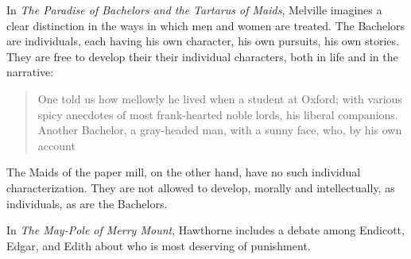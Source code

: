 \documentclass[man,12pt,natbib]{apa6}
\begin{document}
In \emph{The Paradise of Bachelors and the Tartarus of Maids}, Melville
imagines a clear distinction in the ways in which men and women are treated.
The Bachelors are individuals, each having his own character, his own pursuits,
his own stories. They are free to develop their their individual characters,
both in life and in the narrative:
\begin{quote}
	One told us how mellowly he lived when a student at Oxford; with various spicy anecdotes of most frank-hearted noble lords, his liberal companions.
	Another Bachelor, a gray-headed man, with a sunny face, who, by his own account 
\end{quote}

The Maids of the paper mill, on the other hand, have no such individual
characterization. They are not allowed to develop, morally and intellectually,
as individuals, as are the Bachelors.

In \emph{The May-Pole of Merry Mount}, Hawthorne includes a debate among
Endicott, Edgar, and Edith about who is most deserving of punishment.

\nocite{Child12b, Melville12, Poe12b}

\clearpage

\end{document}
